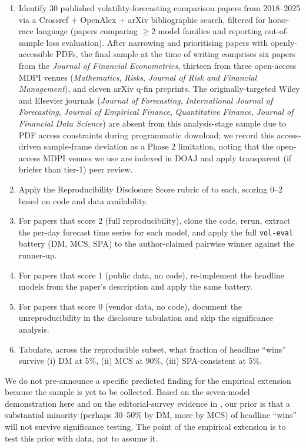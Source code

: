 \begin{enumerate}[leftmargin=*]
    \item Identify 30 published volatility-forecasting comparison papers from 2018--2025 via a Crossref + OpenAlex + arXiv bibliographic search, filtered for horse-race language (papers comparing $\geq 2$ model families and reporting out-of-sample loss evaluation). After narrowing and prioritising papers with openly-accessible PDFs, the final sample at the time of writing comprises six papers from the \emph{Journal of Financial Econometrics}, thirteen from three open-access MDPI venues (\emph{Mathematics}, \emph{Risks}, \emph{Journal of Risk and Financial Management}), and eleven arXiv q-fin preprints. The originally-targeted Wiley and Elsevier journals (\emph{Journal of Forecasting}, \emph{International Journal of Forecasting}, \emph{Journal of Empirical Finance}, \emph{Quantitative Finance}, \emph{Journal of Financial Data Science}) are absent from this analysis-stage sample due to PDF access constraints during programmatic download; we record this access-driven sample-frame deviation as a Phase 2 limitation, noting that the open-access MDPI venues we use are indexed in DOAJ and apply transparent (if briefer than tier-1) peer review.
    \item Apply the Reproducibility Disclosure Score rubric of \citet{Khan2026Survey} to each, scoring 0--2 based on code and data availability.
    \item For papers that score 2 (full reproducibility), clone the code, rerun, extract the per-day forecast time series for each model, and apply the full \texttt{vol-eval} battery (DM, MCS, SPA) to the author-claimed pairwise winner against the runner-up.
    \item For papers that score 1 (public data, no code), re-implement the headline models from the paper's description and apply the same battery.
    \item For papers that score 0 (vendor data, no code), document the unreproducibility in the disclosure tabulation and skip the significance analysis.
    \item Tabulate, across the reproducible subset, what fraction of headline ``wins'' survive (i) DM at 5\%, (ii) MCS at 90\%, (iii) SPA-consistent at 5\%.
\end{enumerate}

We do not pre-announce a specific predicted finding for the empirical extension because the sample is yet to be collected. Based on the seven-model demonstration here and on the editorial-survey evidence in \citet{Khan2026Survey}, our prior is that a substantial minority (perhaps 30--50\% by DM, more by MCS) of headline ``wins'' will not survive significance testing. The point of the empirical extension is to test this prior with data, not to assume it.

